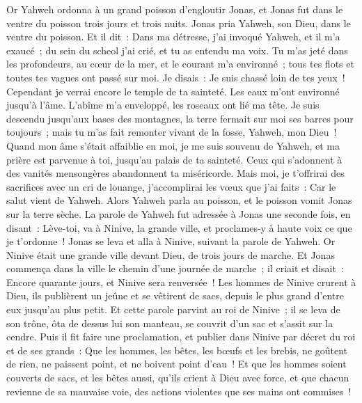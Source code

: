 \begin{multicols}{2}
\VerseOne{}Or Yahweh ordonna à un grand poisson d'engloutir Jonas, et Jonas fut dans le ventre du poisson trois jours et trois nuits.
Jonas pria Yahweh, son Dieu, dans le ventre du poisson.
Et il dit~: Dans ma détresse, j'ai invoqué Yahweh, et il m'a exaucé~; du sein du scheol j'ai crié, et tu as entendu ma voix.
Tu m'as jeté dans les profondeurs, au cœur de la mer, et le courant m'a environné~; tous tes flots et toutes tes vagues ont passé sur moi.
Je disais~: Je suis chassé loin de tes yeux~! Cependant je verrai encore le temple de ta sainteté.
Les eaux m'ont environné jusqu'à l'âme. L'abîme m'a enveloppé, les roseaux ont lié ma tête.
Je suis descendu jusqu'aux bases des montagnes, la terre fermait sur moi ses barres pour toujours~; mais tu m'as fait remonter vivant de la fosse, Yahweh, mon Dieu~!
Quand mon âme s'était affaiblie en moi, je me suis souvenu de Yahweh, et ma prière est parvenue à toi, jusqu'au palais de ta sainteté.
Ceux qui s'adonnent à des vanités mensongères abandonnent ta miséricorde.
Mais moi, je t'offrirai des sacrifices avec un cri de louange, j'accomplirai les vœux que j'ai faits~: Car le salut vient de Yahweh.
Alors Yahweh parla au poisson, et le poisson vomit Jonas sur la terre sèche.
\VerseOne{}La parole de Yahweh fut adressée à Jonas une seconde fois, en disant~:
Lève-toi, va à Ninive, la grande ville, et proclames-y à haute voix ce que je t'ordonne~!
Jonas se leva et alla à Ninive, suivant la parole de Yahweh. Or Ninive était une grande ville devant Dieu, de trois jours de marche.
Et Jonas commença dans la ville le chemin d'une journée de marche~; il criait et disait~: Encore quarante jours, et Ninive sera renversée~!
Les hommes de Ninive crurent à Dieu, ils publièrent un jeûne et se vêtirent de sacs, depuis le plus grand d'entre eux jusqu'au plus petit.
Et cette parole parvint au roi de Ninive~; il se leva de son trône, ôta de dessus lui son manteau, se couvrit d'un sac et s'assit sur la cendre.
Puis il fit faire une proclamation, et publier dans Ninive par décret du roi et de ses grands~: Que les hommes, les bêtes, les bœufs et les brebis, ne goûtent de rien, ne paissent point, et ne boivent point d'eau~!
Et que les hommes soient couverts de sacs, et les bêtes aussi, qu'ils crient à Dieu avec force, et que chacun revienne de sa mauvaise voie, des actions violentes que ses mains ont commises~!

\end{multicols}
